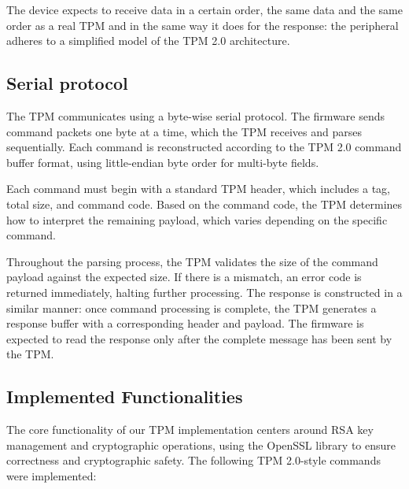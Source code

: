     The device expects to receive data in a certain order, 
    the same data and the same order as a real TPM and in the same way it does for the response:
    the peripheral adheres to a simplified model of the TPM 2.0 architecture.

    \subsection{Serial protocol}
        The TPM communicates using a byte-wise serial protocol. The firmware sends command 
        packets one byte at a time, which the TPM receives and parses sequentially.
        Each command is reconstructed according to the TPM 2.0 command buffer format, 
        using little-endian byte order for multi-byte fields.

        Each command must begin with a standard TPM header, which includes a tag, total size, and command code. 
        Based on the command code, the TPM determines how to interpret the remaining 
        payload, which varies depending on the specific command. 

        Throughout the parsing process, the TPM validates the size of the 
        command payload against the expected size. 
        If there is a mismatch, an error code is returned immediately, halting further processing.
        The response is constructed in a similar manner: once command processing is complete, 
        the TPM generates a response buffer with a corresponding header and payload. 
        The firmware is expected to read the response only after the complete message has been sent by the TPM.
    
    \subsection{Implemented Functionalities}

        The core functionality of our TPM implementation centers around RSA key management and cryptographic operations, 
        using the OpenSSL library to ensure correctness and cryptographic safety. 
        The following TPM 2.0-style commands were implemented:

